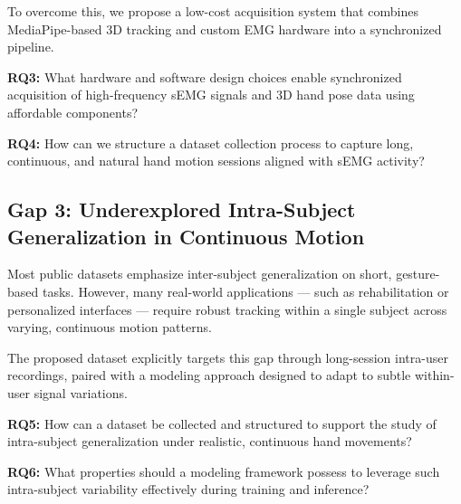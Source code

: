 To overcome this, we propose a low-cost acquisition system that combines MediaPipe-based 3D tracking and custom EMG hardware into a synchronized pipeline.

\textbf{RQ3:} What hardware and software design choices enable synchronized acquisition of high-frequency sEMG signals and 3D hand pose data using affordable components?

\textbf{RQ4:} How can we structure a dataset collection process to capture long, continuous, and natural hand motion sessions aligned with sEMG activity?

\subsection*{Gap 3: Underexplored Intra-Subject Generalization in Continuous Motion}

Most public datasets emphasize inter-subject generalization on short, gesture-based tasks. However, many real-world applications — such as rehabilitation or personalized interfaces — require robust tracking within a single subject across varying, continuous motion patterns.

The proposed dataset explicitly targets this gap through long-session intra-user recordings, paired with a modeling approach designed to adapt to subtle within-user signal variations.

\textbf{RQ5:} How can a dataset be collected and structured to support the study of intra-subject generalization under realistic, continuous hand movements?

\textbf{RQ6:} What properties should a modeling framework possess to leverage such intra-subject variability effectively during training and inference?